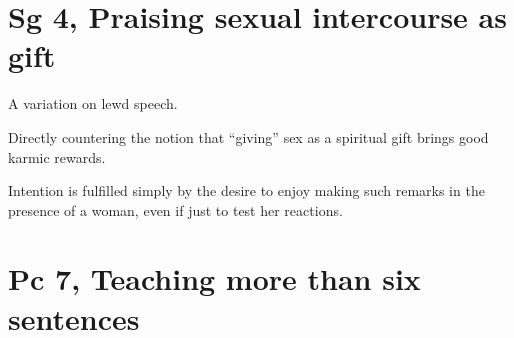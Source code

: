 \section{Sg 4, Praising sexual intercourse as gift}

A variation on lewd speech.

Directly countering the notion that ``giving'' sex as a spiritual gift
brings good karmic rewards.

Intention is fulfilled simply by the desire to enjoy making such remarks
in the presence of a woman, even if just to test her reactions.

\section{Pc 7, Teaching more than six sentences}

